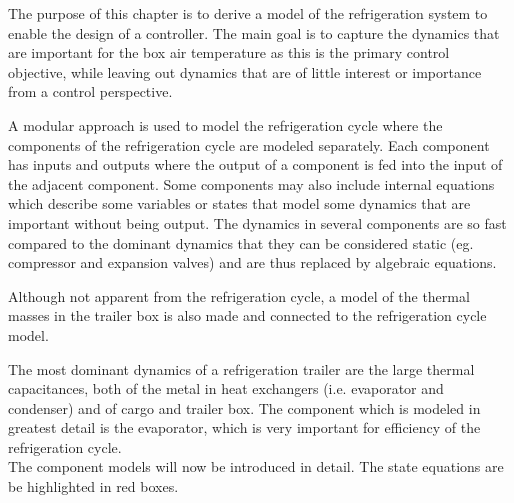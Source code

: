 The purpose of this chapter is to derive a model of the refrigeration system to enable the design of a controller. The main goal is to capture the dynamics that are important for the box air temperature as this is the primary control objective, while leaving out dynamics that are of little interest or importance from a control perspective.

A modular approach is used to model the refrigeration cycle where the components of the refrigeration cycle are modeled separately. Each component has inputs and outputs where the output of a component is fed into the input of the adjacent component. Some components may also include internal equations which describe some variables or states that model some dynamics that are important without being output. The dynamics in several components are so fast compared to the dominant dynamics that they can be considered static (eg. compressor and expansion valves) and are thus replaced by algebraic equations.

Although not apparent from the refrigeration cycle, a model of the thermal masses in the trailer box is also made and connected to the refrigeration cycle model.

The most dominant dynamics of a refrigeration trailer are the large thermal capacitances, both of the metal in heat exchangers (i.e. evaporator and condenser) and of cargo and trailer box. The component which is modeled in greatest detail is the evaporator, which is very important for efficiency of the refrigeration cycle. \\

The component models will now be introduced in detail. The state equations are be highlighted in red boxes.